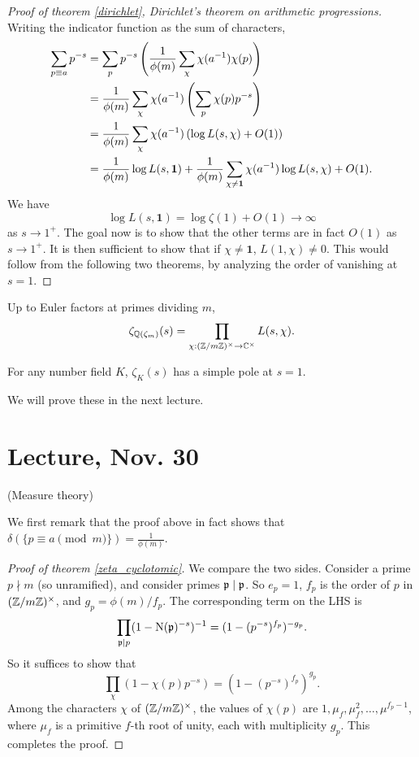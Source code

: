 \documentclass[11pt]{amsart}
\begin{document}
\begin{proof}[Proof of theorem \ref{dirichlet}, Dirichlet's theorem on arithmetic progressions]
Writing the indicator function as the sum of characters,
\begin{align*}
    \sum_{p\equiv a} p^{-s}
    &= \sum_{p} p^{-s} \left( \frac{1}{\phi(m)} \sum_{\chi} \chi(a^{-1})\chi(p) \right) \\
    &= \frac{1}{\phi(m)} \sum_\chi \chi(a^{-1}) \left( \sum_p \chi(p)p^{-s} \right) \\
    &= \frac{1}{\phi(m)} \sum_\chi \chi(a^{-1})\left( \log L(s,\chi) + O(1) \right)  \\
    &= \frac{1}{\phi(m)}\log L(s, \mathbf{1}) + \frac{1}{\phi(m)}\sum_{\chi\neq \mathbf{1}} \chi(a^{-1})\log L(s,\chi) + O(1).
\end{align*}
We have
\[\log L(s,\mathbf{1}) = \log \zeta(1) + O(1) \to \infty\]
as $s\to 1^+$. The goal now is to show that the other terms are in fact $O(1)$ as $s\to 1^+$. It is then sufficient to show that if $\chi\neq \mathbf{1}$, $L(1,\chi) \neq 0$. This would follow from the following two theorems, by analyzing the order of vanishing at $s=1$.
\end{proof}


\begin{thm}
\label{zeta_cyclotomic}
    Up to Euler factors at primes dividing $m$,
    \[\zeta_{\mathbb{Q}(\zeta_m)}(s) = \prod_{\chi: (\mathbb{Z}/m\mathbb{Z})^\times\to \mathbb{C}^\times} L(s,\chi).\]
\end{thm}

\begin{thm}
    For any number field $K$, $\zeta_K(s)$ has a simple pole at $s=1$.
\end{thm}

We will prove these in the next lecture.


\section{Lecture, Nov. 30}

(Measure theory)

We first remark that the proof above in fact shows that $\delta(\{p\equiv a\pmod{m}\}) = \frac{1}{\phi(m)}$.

\begin{proof}[Proof of theorem \ref{zeta_cyclotomic}]
    We compare the two sides. Consider a prime $p\nmid m$ (so unramified), and consider primes $\mathfrak{p}\mid \mathfrak{p}$. So $e_p = 1$, $f_p$ is the order of $p$ in $(\mathbb{Z}/m\mathbb{Z})^\times$, and $g_p = \phi(m)/f_p$. The corresponding term on the LHS is
    \[\prod_{\mathfrak{p}\mid p} (1 - \operatorname{N}(\mathfrak{p})^{-s})^{-1} = (1-(p^{-s})^{f_p})^{-g_p}.\]
    So it suffices to show that
    \[\prod_{\chi} (1 - \chi(p)p^{-s}) = (1 - (p^{-s})^{f_p})^{g_p}.\]
    Among the characters $\chi$ of $(\mathbb{Z}/m\mathbb{Z})^\times$, the values of $\chi(p)$ are $1,\mu_f,\mu_f^2,\dots,\mu^{f_p-1}$, where $\mu_f$ is a primitive $f$-th root of unity, each with multiplicity $g_p$. This completes the proof.
\end{proof}
\end{document}
